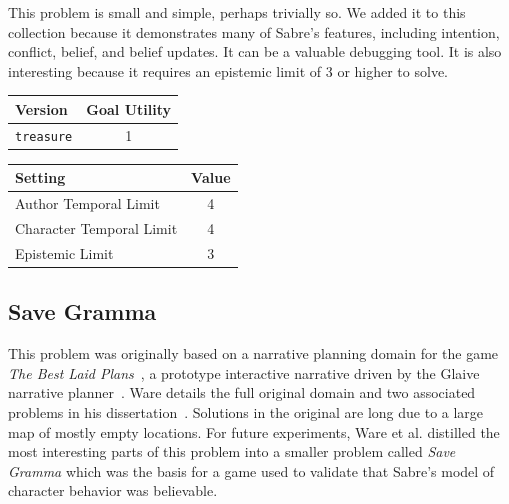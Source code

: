 \documentclass{nilreport}
\begin{document}
This problem is small and simple, perhaps trivially so. We added it
to this collection because it demonstrates many of Sabre's features,
including intention, conflict, belief, and belief updates. It can
be a valuable debugging tool. It is also interesting because it requires
an epistemic limit of 3 or higher to solve.

\medskip{}
\noindent{}

\medskip{}

\begin{center}
\begin{tabular}[t]{|l|c|}
\hline 
\textbf{Version} & \textbf{Goal Utility}\tabularnewline
\hline 
\hline 
\texttt{treasure} & 1\tabularnewline
\hline 
\end{tabular}\textbf{\quad{}}%
\begin{tabular}[t]{|l|c|}
\hline 
\textbf{Setting} & \textbf{Value}\tabularnewline
\hline 
\hline 
Author Temporal Limit & 4\tabularnewline
\hline 
Character Temporal Limit & 4\tabularnewline
\hline 
Epistemic Limit & 3\tabularnewline
\hline 
\end{tabular}
\par\end{center}

\subsection{Save Gramma}

This problem was originally based on a narrative planning domain for
the game \emph{The Best Laid Plans}~\cite{ware2015blp}, a prototype
interactive narrative driven by the Glaive narrative planner~\cite{ware2014glaive}.
Ware details the full original domain and two associated problems
in his dissertation~\cite{ware2014thesis}. Solutions in the original
are long due to a large map of mostly empty locations. For future
experiments, Ware et al. distilled the most interesting parts of this
problem into a smaller problem called \emph{Save Gramma} which was
the basis for a game used to validate that Sabre's model of character
behavior was believable.
\end{document}
